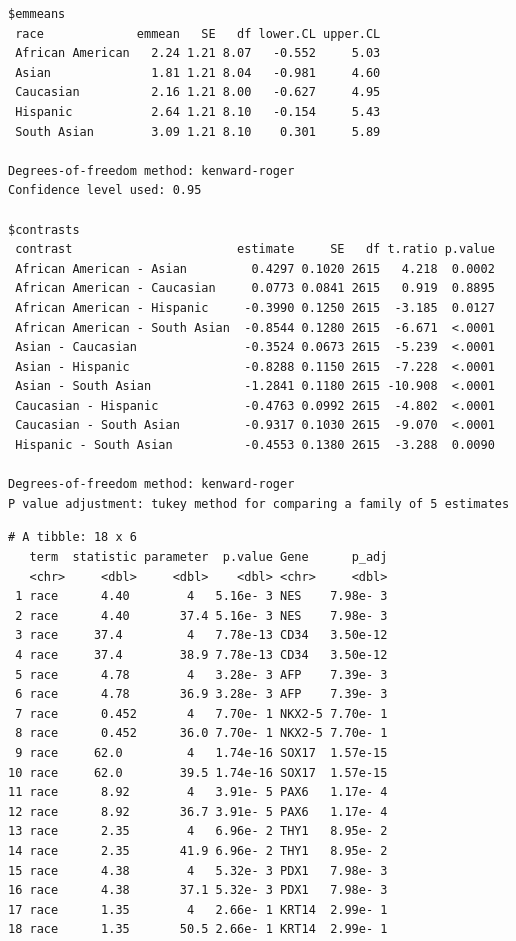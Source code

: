 \documentclass[
  letterpaper,
  DIV=11,
  numbers=noendperiod]{scrartcl}
\newenvironment{Shaded}{\begin{snugshade}}{\end{snugshade}}
\newcommand{\CommentTok}[1]{\textcolor[rgb]{0.37,0.37,0.37}{#1}}
\newcommand{\NormalTok}[1]{\textcolor[rgb]{0.00,0.23,0.31}{#1}}
\newcommand{\SpecialCharTok}[1]{\textcolor[rgb]{0.37,0.37,0.37}{#1}}
\begin{document}
\begin{verbatim}
$emmeans
 race             emmean   SE   df lower.CL upper.CL
 African American   2.24 1.21 8.07   -0.552     5.03
 Asian              1.81 1.21 8.04   -0.981     4.60
 Caucasian          2.16 1.21 8.00   -0.627     4.95
 Hispanic           2.64 1.21 8.10   -0.154     5.43
 South Asian        3.09 1.21 8.10    0.301     5.89

Degrees-of-freedom method: kenward-roger 
Confidence level used: 0.95 

$contrasts
 contrast                       estimate     SE   df t.ratio p.value
 African American - Asian         0.4297 0.1020 2615   4.218  0.0002
 African American - Caucasian     0.0773 0.0841 2615   0.919  0.8895
 African American - Hispanic     -0.3990 0.1250 2615  -3.185  0.0127
 African American - South Asian  -0.8544 0.1280 2615  -6.671  <.0001
 Asian - Caucasian               -0.3524 0.0673 2615  -5.239  <.0001
 Asian - Hispanic                -0.8288 0.1150 2615  -7.228  <.0001
 Asian - South Asian             -1.2841 0.1180 2615 -10.908  <.0001
 Caucasian - Hispanic            -0.4763 0.0992 2615  -4.802  <.0001
 Caucasian - South Asian         -0.9317 0.1030 2615  -9.070  <.0001
 Hispanic - South Asian          -0.4553 0.1380 2615  -3.288  0.0090

Degrees-of-freedom method: kenward-roger 
P value adjustment: tukey method for comparing a family of 5 estimates 
\end{verbatim}

\begin{Shaded}
\end{Shaded}

\begin{verbatim}
# A tibble: 18 x 6
   term  statistic parameter  p.value Gene      p_adj
   <chr>     <dbl>     <dbl>    <dbl> <chr>     <dbl>
 1 race      4.40        4   5.16e- 3 NES    7.98e- 3
 2 race      4.40       37.4 5.16e- 3 NES    7.98e- 3
 3 race     37.4         4   7.78e-13 CD34   3.50e-12
 4 race     37.4        38.9 7.78e-13 CD34   3.50e-12
 5 race      4.78        4   3.28e- 3 AFP    7.39e- 3
 6 race      4.78       36.9 3.28e- 3 AFP    7.39e- 3
 7 race      0.452       4   7.70e- 1 NKX2-5 7.70e- 1
 8 race      0.452      36.0 7.70e- 1 NKX2-5 7.70e- 1
 9 race     62.0         4   1.74e-16 SOX17  1.57e-15
10 race     62.0        39.5 1.74e-16 SOX17  1.57e-15
11 race      8.92        4   3.91e- 5 PAX6   1.17e- 4
12 race      8.92       36.7 3.91e- 5 PAX6   1.17e- 4
13 race      2.35        4   6.96e- 2 THY1   8.95e- 2
14 race      2.35       41.9 6.96e- 2 THY1   8.95e- 2
15 race      4.38        4   5.32e- 3 PDX1   7.98e- 3
16 race      4.38       37.1 5.32e- 3 PDX1   7.98e- 3
17 race      1.35        4   2.66e- 1 KRT14  2.99e- 1
18 race      1.35       50.5 2.66e- 1 KRT14  2.99e- 1
\end{verbatim}
\end{document}
